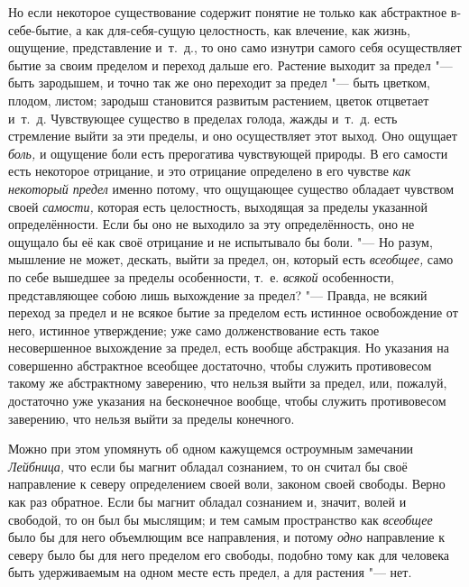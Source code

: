 Но если некоторое существование содержит понятие не только как абстрактное
в-себе-бытие, а как для-себя-сущую целостность, как влечение, как жизнь,
ощущение, представление и~т.~д., то оно само изнутри самого себя
осуществляет бытие за своим пределом и переход дальше его. Растение выходит
за предел "--- быть зародышем, и точно так же оно переходит за предел "--- быть
цветком, плодом, листом; зародыш становится развитым растением, цветок
отцветает и~т.~д. Чувствующее существо в пределах голода, жажды и~т.~д.
есть стремление выйти за эти пределы, и оно осуществляет этот выход. Оно
ощущает {\em боль,} и ощущение боли есть прерогатива
чувствующей природы. В его самости есть некоторое отрицание, и это
отрицание определено в его чувстве {\em как некоторый
предел} именно потому, что ощущающее существо обладает чувством своей
{\em самости,} которая есть целостность, выходящая за
пределы указанной определённости. Если бы оно не выходило за эту
определённость, оно не ощущало бы её как своё отрицание и не испытывало бы
боли. "--- Но разум, мышление не может, дескать, выйти за предел, он, который
есть {\em всеобщее,} само по себе вышедшее за пределы
особенности, т.~е. {\em всякой} особенности,
представляющее собою лишь выхождение за предел? "--- Правда, не всякий переход
за предел и не всякое бытие за пределом есть истинное освобождение от него,
истинное утверждение; уже само долженствование есть такое несовершенное
выхождение за предел, есть вообще абстракция. Но указания на совершенно
абстрактное всеобщее достаточно, чтобы служить противовесом такому же
абстрактному заверению, что нельзя выйти за предел, или, пожалуй,
достаточно уже указания на бесконечное вообще, чтобы служить противовесом
заверению, что нельзя выйти за пределы конечного.

Можно при этом упомянуть об одном кажущемся остроумным замечании
{\em Лейбница,} что если бы магнит обладал сознанием,
то он считал бы своё направление к северу определением своей воли, законом
своей свободы\label{magpage}. Верно как раз
обратное. Если бы магнит обладал сознанием и, значит, волей и свободой, то
он был бы мыслящим; и тем самым пространство как
{\em всеобщее} было бы для него объемлющим все
направления, и потому {\em одно} направление к северу
было бы для него пределом его свободы, подобно тому как для человека быть
удерживаемым на одном месте есть предел, а для растения "--- нет.

